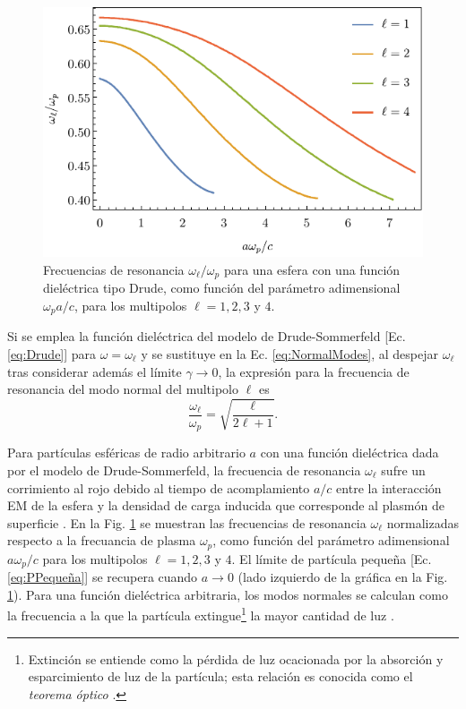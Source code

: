 \documentclass[letterpaper,11pt] {article}
\begin{document}
	\begin{figure}[b!]\centering
		\includegraphics[scale=1]{0-DrudeMultipoles.pdf}
	\caption{Frecuencias de resonancia $\omega_\ell/\omega_p$ para una esfera con una función dieléctrica tipo Drude, como función del parámetro adimensional  $\omega_p a / c$, para los multipolos $\ell = 1,2,3$ y $4$. }
	\label{fig:NormalModes}
	\end{figure}			
	
Si se emplea la función dieléctrica del modelo de Drude-Sommerfeld [Ec.  \eqref{eq:Drude}] para $\omega = \omega_\ell$	y se sustituye en la Ec.  \eqref{eq:NormalModes}, al despejar $\omega_\ell$ tras considerar además el límite $\gamma\to 0$, la expresión para la frecuencia de resonancia del  modo normal del multipolo $\ell$ es \cite{maciel2017momentum}
	\begin{equation}
	\frac{\omega_\ell}{\omega_p} = \sqrt{ \frac{\ell}{2\ell+1}}.  \label{eq:PPequeña}
	\end{equation}
	
Para partículas esféricas de radio arbitrario $a$ con una función dieléctrica dada por el modelo de Drude-Sommerfeld, la frecuencia de resonancia $\omega_\ell$ sufre un corrimiento al rojo debido al tiempo de acomplamiento $a/c$ entre la interacción EM de la esfera y  la densidad de carga inducida que corresponde al plasmón de superficie \cite{aizpurua1998coupling}.  En la Fig.  \ref{fig:NormalModes} se muestran las frecuencias de resonancia $\omega_\ell$ normalizadas respecto a la frecuancia de plasma $\omega_p$, como función del parámetro adimensional $a\omega_p / c$ para los multipolos $\ell = 1,2,3$ y $4$.  El límite de partícula pequeña [Ec.  \eqref{eq:PPequeña}]	se recupera cuando  $a\to 0$ (lado izquierdo de la gráfica en la Fig.  \ref{fig:NormalModes}).  Para una función dieléctrica arbitraria, los modos normales se calculan como la frecuencia a la que la partícula extingue\footnote{Extinción se entiende como la pérdida de luz ocacionada por la absorción y esparcimiento de luz de la partícula; esta relación es conocida como el  \emph{teorema óptico} \cite{bohren1998absorption}. } la mayor cantidad de luz \cite{kreibig1995clusters}. 	
	
\end{document}
